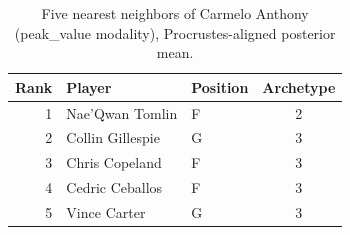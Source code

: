 \begin{table}[htbp]
  \centering\small
  \begin{tabular}{rllc}
    \toprule
    Rank & Player & Position & Archetype \\
    \midrule
    1 & Nae'Qwan Tomlin & F & 2 \\
    2 & Collin Gillespie & G & 3 \\
    3 & Chris Copeland & F & 3 \\
    4 & Cedric Ceballos & F & 3 \\
    5 & Vince Carter & G & 3 \\
    \bottomrule
  \end{tabular}
  \caption{Five nearest neighbors of Carmelo Anthony (peak_value modality), Procrustes-aligned posterior mean.}
  \label{tab:Carmelo_Anthony_neighbors_peak_value}
\end{table}

